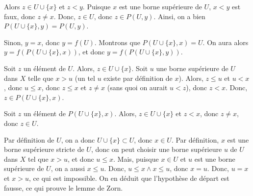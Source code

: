                         Alors $z \in U \cup \lbrace x \rbrace$ et $z < y$.
                        Puisque $x$ est une borne supérieure de $U$, $x < y$ est faux, donc $z \neq x$.
                        Donc, $z \in U$, donc $z \in P(U, y)$.
                \stopitemize
                Ainsi, on a bien $P(U \cup \lbrace x \rbrace, y) = P(U, y)$.
            \item Sinon, $y = x$, donc $y = f(U)$. 
                Montrons que $P(U \cup \lbrace x \rbrace, x) = U$.
                On aura alors $y = f(P(U \cup \lbrace x \rbrace, x))$, et donc $y = f(P(U \cup \lbrace x \rbrace, y))$. 
                \startitemize[nowhite]
                    \item Soit $z$ un élément de $U$.
                        Alors, $z \in U \cup \lbrace x \rbrace$.
                        Soit $u$ une borne supérieure de $U$ dans $X$ telle que $x > u$ (un tel $u$ existe par définition de $x$).
                        Alors, $z \leq u$ et $u < x$, donc $u \leq x$, donc $z \leq x$ et $z \neq x$ (sans quoi on aurait $u < z$), donc $z < x$.
                        Donc, $z \in P(U \cup \lbrace x \rbrace, x)$.
                    \item Soit $z$ un élément de $P(U \cup \lbrace x \rbrace, x)$.
                        Alors, $z \in U \cup \lbrace x \rbrace$ et $z < x$, donc $z \neq x$, donc $z \in U$.
                \stopitemize
        \stopitemize
\stopitemize

\done

\blank[medium]

Par définition de $U$, on a donc $U \cup \lbrace x \rbrace \subset U$, donc $x \in U$. 
Par définition, $x$ est une borne supérieure stricte de $U$, donc on peut choisir une borne supérieure $u$ de $U$ dans $X$ tel que $x > u$, et donc $u \leq x$. 
Mais, puisque $x \in U$ et $u$ est une borne supérieure de $U$, on a aussi $x \leq u$. 
Donc, $u \leq x \wedge x \leq u$, donc $x = u$.
Donc, $u = x$ et $x > u$, ce qui est impossible. 
On en déduit que l'hypothèse de départ est fausse, ce qui prouve le lemme de Zorn.

\stopsubsection

\stopsection
